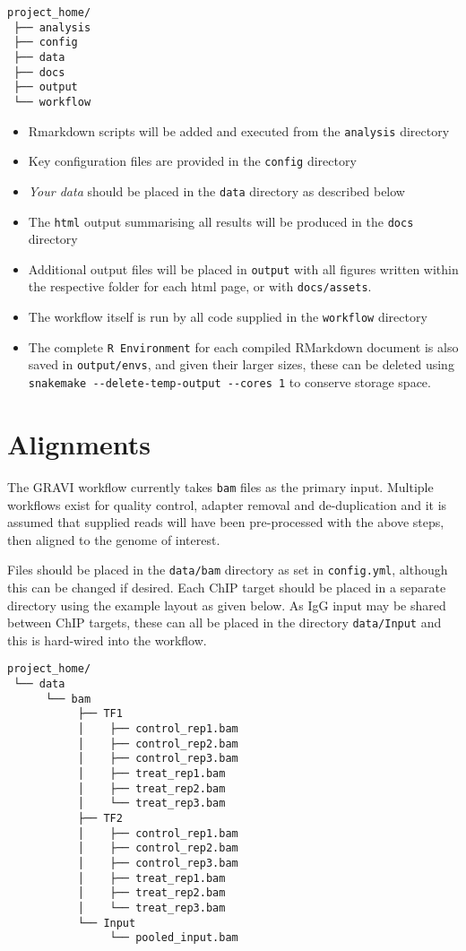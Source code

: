\documentclass[
]{book}
\providecommand{\tightlist}{%
  \setlength{\itemsep}{0pt}\setlength{\parskip}{0pt}}
\begin{document}
\begin{verbatim}
project_home/
 ├── analysis
 ├── config
 ├── data
 ├── docs
 ├── output
 └── workflow
\end{verbatim}

\begin{itemize}
\tightlist
\item
  Rmarkdown scripts will be added and executed from the \texttt{analysis} directory
\item
  Key configuration files are provided in the \texttt{config} directory
\item
  \emph{Your data} should be placed in the \texttt{data} directory as described below
\item
  The \texttt{html} output summarising all results will be produced in the \texttt{docs} directory
\item
  Additional output files will be placed in \texttt{output} with all figures written within the respective folder for each html page, or with \texttt{docs/assets}.
\item
  The workflow itself is run by all code supplied in the \texttt{workflow} directory
\item
  The complete \texttt{R\ Environment} for each compiled RMarkdown document is also saved in \texttt{output/envs}, and given their larger sizes, these can be deleted using \texttt{snakemake\ -\/-delete-temp-output\ -\/-cores\ 1} to conserve storage space.
\end{itemize}

\hypertarget{alignments}{%
\section{Alignments}\label{alignments}}

The GRAVI workflow currently takes \texttt{bam} files as the primary input.
Multiple workflows exist for quality control, adapter removal and de-duplication and it is assumed that supplied reads will have been pre-processed with the above steps, then aligned to the genome of interest.

Files should be placed in the \texttt{data/bam} directory as set in \texttt{config.yml}, although this can be changed if desired.
Each ChIP target should be placed in a separate directory using the example layout as given below.
As IgG input may be shared between ChIP targets, these can all be placed in the directory \texttt{data/Input} and this is hard-wired into the workflow.

\begin{verbatim}
project_home/
 └── data
      └── bam 
           ├── TF1 
           │    ├── control_rep1.bam
           │    ├── control_rep2.bam
           │    ├── control_rep3.bam
           │    ├── treat_rep1.bam
           │    ├── treat_rep2.bam
           │    └── treat_rep3.bam
           ├── TF2 
           │    ├── control_rep1.bam
           │    ├── control_rep2.bam
           │    ├── control_rep3.bam
           │    ├── treat_rep1.bam
           │    ├── treat_rep2.bam
           │    └── treat_rep3.bam           
           └── Input
                └── pooled_input.bam 
\end{verbatim}
\end{document}
